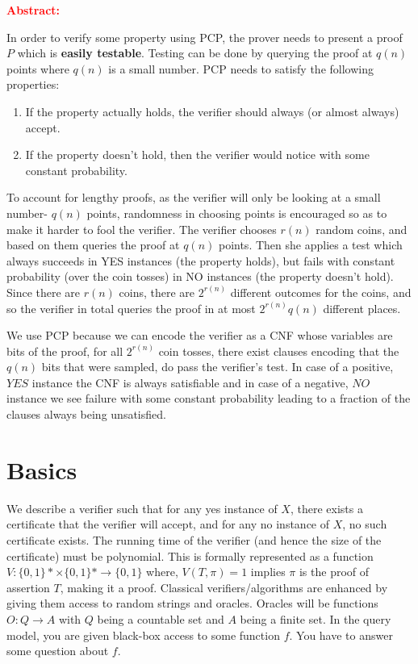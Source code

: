 \textcolor{red}{\textbf{Abstract:} }

In order to verify some property using PCP, the prover needs to present a proof $P$ which is \textbf{easily testable}. Testing can be done by querying the proof at $q(n)$ points where $q(n)$ is a small number. PCP needs to satisfy the following properties: 
\begin{enumerate}[nolistsep]
    \item If the property actually holds, the verifier should always (or almost always) accept.
    \item If the property doesn't hold, then the verifier would notice with some constant probability.
\end{enumerate}

To account for lengthy proofs, as the verifier will only be looking at a small number- $q(n)$ points, randomness in choosing points is encouraged so as to make it harder to fool the verifier. The verifier chooses $r(n)$ random coins, and based on them queries the proof at $q(n)$ points. Then she applies a test which always succeeds in YES instances (the property holds), but fails with constant probability (over the coin tosses) in NO instances (the property doesn't hold). Since there are $r(n)$ coins, there are $2^{r(n)}$ different outcomes for the coins, and so the verifier in total queries the proof in at most $2^{r(n)}q(n)$ different places.

We use PCP because we can encode the verifier as a CNF whose variables are bits of the proof, for all $2^{r(n)}$ coin tosses, there exist clauses encoding that the $q(n)$ bits that were sampled, do pass the verifier's test. In case of a positive, $YES$ instance the CNF is always satisfiable and in case of a negative, $NO$ instance we see failure with some constant probability leading to a fraction of the clauses always being unsatisfied. 


\section{Basics}
We describe a verifier such that for any yes instance of $X$, there exists a certificate that the verifier will accept, and for any no instance of $X$, no such certificate exists. The running time of the verifier (and hence the size of the certificate) must be polynomial. This is formally represented as a function $V: \{0,1\}* \times \{0,1\}* \rightarrow \{0,1\}$ where, $V(T,\pi) = 1$ implies $\pi$ is the proof of assertion $T$, making it a proof. Classical verifiers/algorithms are enhanced by giving them access to random strings and oracles. Oracles will be functions $O: Q \rightarrow A$ with $Q$ being a countable set and $A$ being a finite set. In the query model, you are given
black-box access to some function $f$. You have to answer some question about $f$. 

